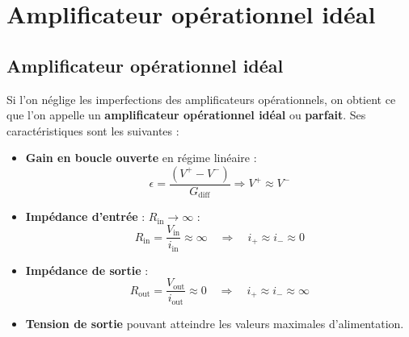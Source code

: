 \section{Amplificateur opérationnel id\'eal}

\subsection{Amplificateur opérationnel idéal}

Si l’on néglige les imperfections des amplificateurs opérationnels, on obtient ce que l’on appelle un \textbf{amplificateur opérationnel idéal} ou \textbf{parfait}. Ses caractéristiques sont les suivantes :

\begin{itemize}
    \item \textbf{Gain en boucle ouverte} en régime linéaire :\\ 
    \[
        \epsilon = \frac{\left(V^+-V^-\right)}{G_{\text{diff}}}\Rightarrow V^+ \approx V^-
    \]
    \item \textbf{Impédance d’entrée} : \( R_{\text{in}} \to \infty \) :\\
    \[
        R_{\text{in}} = \frac{V_{\text{in}}}{i_{\text{in}}} \approx \infty \quad \Rightarrow \quad i_+ \approx i_- \approx 0
    \]
    \item \textbf{Impédance de sortie} :\\
    \[
        R_{\text{out}} = \frac{V_{\text{out}}}{i_{\text{out}}} \approx 0 \quad \Rightarrow \quad i_+ \approx i_- \approx \infty
    \]
    \item \textbf{Tension de sortie} pouvant atteindre les valeurs maximales d’alimentation.
\end{itemize}

